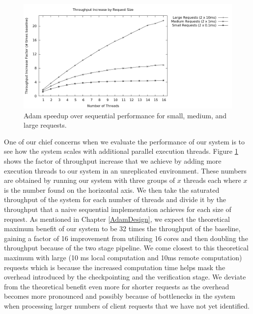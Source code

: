 \documentclass[11pt, oneside]{report}
\begin{document}
\begin{figure}[h]
\centering
\includegraphics[width=1.0\textwidth]{graphs/requestweights/graph.png}
\caption{\label{scaling}Adam speedup over sequential performance for small, medium, and large requests.}
\end{figure}

One of our chief concerns when we evaluate the performance of our system is to see how the system scales with additional parallel execution threads. Figure \ref{scaling} shows the factor of throughput increase that we achieve by adding more execution threads to our system in an unreplicated environment.
These numbers are obtained by running our system with three groups of $x$ threads each where $x$ is the number found on the horizontal axis. 
We then take the saturated throughput of the system for each number of threads and divide it by the throughput that a naive sequential implementation achieves for each size of request.
As mentioned in Chapter \ref{AdamDesign}, we expect the theoretical maximum benefit of our system to be 32 times the throughput of the baseline, gaining a factor of 16 improvement from utilizing 16 cores and then doubling the throughput because of the two stage pipeline.
We come closest to this theoretical maximum with large (10 ms local computation and 10ms remote computation) requests which is because the increased computation time helps mask the overhead introduced by the checkpointing and the verification stage.
We deviate from the theoretical benefit even more for shorter requests as the overhead becomes more pronounced and possibly because of bottlenecks in the system when processing larger numbers of client requests that we have not yet identified.
\end{document}

